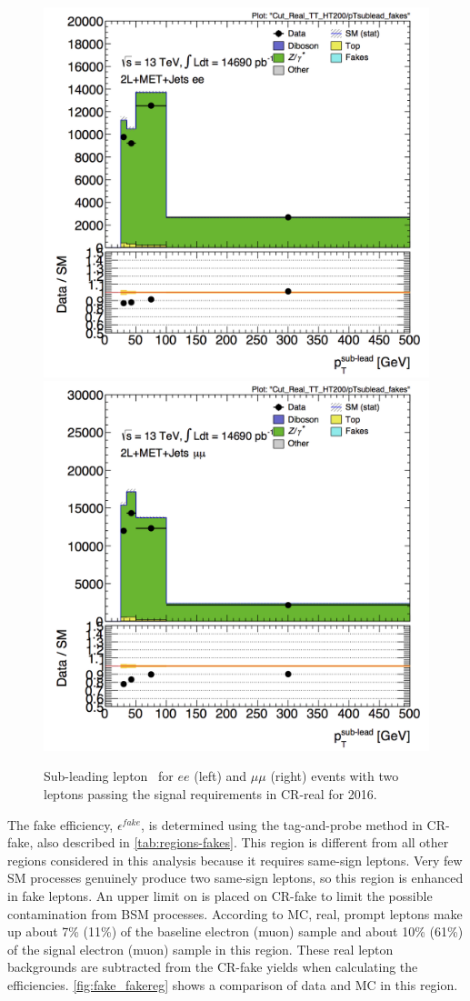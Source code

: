 \begin{centering}
\begin{figure}[bth]
\myfloatalign
\includegraphics[width=.48\linewidth]{figures/fakes/ee-Cut_Real_TT_HT200-pTsublead_fakes-lin_2016.png}
\includegraphics[width=.48\linewidth]{figures/fakes/mm-Cut_Real_TT_HT200-pTsublead_fakes-lin_2016.png}
\caption{Sub-leading lepton \pT\ for $ee$ (left) and $\mu\mu$ (right) events with two leptons passing the signal requirements in CR-real for 2016. }
\label{fig:fake_realreg}
\end{figure}
\end{centering}

The fake efficiency, $\epsilon^{fake}$, is determined using the tag-and-probe method in CR-fake, also described in \autoref{tab:regions-fakes}. This region is different from all other regions considered in this analysis because it requires same-sign leptons. Very few \ac{SM} processes genuinely produce two same-sign leptons, so this region is enhanced in fake leptons. An upper limit on \met is placed on CR-fake to limit the possible contamination from \ac{BSM} processes. According to \ac{MC}, real, prompt leptons make up about 7\% (11\%) of the baseline electron (muon) sample and about 10\% (61\%) of the signal electron (muon) sample in this region. These real lepton backgrounds are subtracted from the CR-fake yields when calculating the efficiencies. \autoref{fig:fake_fakereg} shows a comparison of data and \ac{MC} in this region.

